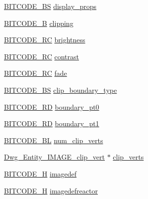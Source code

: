 \begin{DoxyCompactItemize}
\begin{tabbing}
\end{tabbing}\item 
\hyperlink{dwg_8h_a94297606fbd4a4ff97e8add284af0809}{\-B\-I\-T\-C\-O\-D\-E\-\_\-\-B\-S} \hyperlink{struct__dwg__entity__IMAGE_a905eeea8d2386084cccc488eec750faf}{display\-\_\-props}
\item 
\hyperlink{dwg_8h_ab533b1f62d9086749e3bb5b67e9f224e}{\-B\-I\-T\-C\-O\-D\-E\-\_\-\-B} \hyperlink{struct__dwg__entity__IMAGE_a147dc859731605a3cd3ba7feb49b1e52}{clipping}
\item 
\hyperlink{dwg_8h_a7fd199a8f9c9cc52bdab220f65a2a619}{\-B\-I\-T\-C\-O\-D\-E\-\_\-\-R\-C} \hyperlink{struct__dwg__entity__IMAGE_a5af0647bb56af329e9eac40c9dce6fea}{brightness}
\item 
\hyperlink{dwg_8h_a7fd199a8f9c9cc52bdab220f65a2a619}{\-B\-I\-T\-C\-O\-D\-E\-\_\-\-R\-C} \hyperlink{struct__dwg__entity__IMAGE_adb0dc2efc97a78d793039233af9db47d}{contrast}
\item 
\hyperlink{dwg_8h_a7fd199a8f9c9cc52bdab220f65a2a619}{\-B\-I\-T\-C\-O\-D\-E\-\_\-\-R\-C} \hyperlink{struct__dwg__entity__IMAGE_a0022d44524e0a86e75336dd9034090a7}{fade}
\item 
\hyperlink{dwg_8h_a94297606fbd4a4ff97e8add284af0809}{\-B\-I\-T\-C\-O\-D\-E\-\_\-\-B\-S} \hyperlink{struct__dwg__entity__IMAGE_aa3059a975ff63cf50e2268f6e796577c}{clip\-\_\-boundary\-\_\-type}
\item 
\hyperlink{dwg_8h_a1d23a9bc9a02453876b244dc6706f6a6}{\-B\-I\-T\-C\-O\-D\-E\-\_\-R\-D} \hyperlink{struct__dwg__entity__IMAGE_a602552865d7c71cd2c305d555d9f0067}{boundary\-\_\-pt0}
\item 
\hyperlink{dwg_8h_a1d23a9bc9a02453876b244dc6706f6a6}{\-B\-I\-T\-C\-O\-D\-E\-\_\-R\-D} \hyperlink{struct__dwg__entity__IMAGE_afd62200b898caabe208666342efd213c}{boundary\-\_\-pt1}
\item 
\hyperlink{dwg_8h_aebd5f127038868cbabc3d55d91da776c}{\-B\-I\-T\-C\-O\-D\-E\-\_\-\-B\-L} \hyperlink{struct__dwg__entity__IMAGE_aec0bd0ceee79f68845c7d00a272df60c}{num\-\_\-clip\-\_\-verts}
\item 
\hyperlink{dwg_8h_a7edb65b10ba7ad83b842cbd563895bcc}{\-Dwg\-\_\-\-Entity\-\_\-\-I\-M\-A\-G\-E\-\_\-clip\-\_\-vert} $\ast$ \hyperlink{struct__dwg__entity__IMAGE_afd08b041501b83c792efb1df113cb355}{clip\-\_\-verts}
\item 
\hyperlink{dwg_8h_a7c700e94e047a97ba8c24bdfe4029dc3}{\-B\-I\-T\-C\-O\-D\-E\-\_\-\-H} \hyperlink{struct__dwg__entity__IMAGE_a41cb1e6d18ce86abae2106c6ff6dbeb8}{imagedef}
\item 
\hyperlink{dwg_8h_a7c700e94e047a97ba8c24bdfe4029dc3}{\-B\-I\-T\-C\-O\-D\-E\-\_\-\-H} \hyperlink{struct__dwg__entity__IMAGE_a11f59fddad95f69040534e6bf5a138c2}{imagedefreactor}
\end{DoxyCompactItemize}


